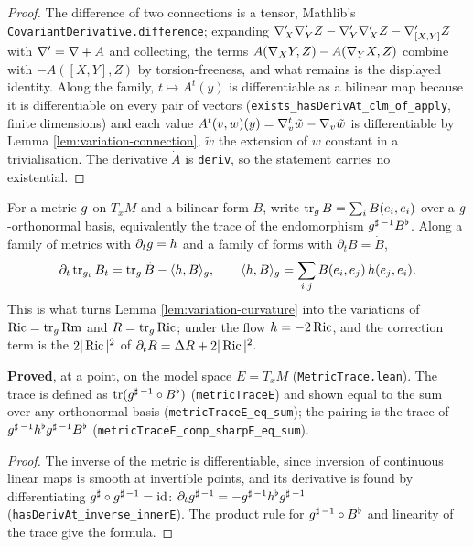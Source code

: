 \begin{proof}
  \leanok
  The difference of two connections is a tensor, Mathlib's
  \texttt{CovariantDerivative.difference}; expanding
  $\nabla'_X \nabla'_Y Z - \nabla'_Y \nabla'_X Z - \nabla'_{[X,Y]} Z$ with
  $\nabla' = \nabla + A$ and collecting, the terms $A(\nabla_X Y, Z) - A(\nabla_Y X, Z)$
  combine with $-A([X,Y], Z)$ by torsion-freeness, and what remains is the
  displayed identity. Along the family, $t \mapsto A^t(y)$ is differentiable as a
  bilinear map because it is differentiable on every pair of vectors
  (\texttt{exists\_hasDerivAt\_clm\_of\_apply}, finite dimensions) and each value
  $A^t(v,w)(y) = \nabla^t_v \tilde w - \nabla_v \tilde w$ is differentiable by
  Lemma \ref{lem:variation-connection}, $\tilde w$ the extension of $w$ constant
  in a trivialisation. The derivative $\dot A$ is \texttt{deriv}, so the
  statement carries no existential.
\end{proof}

\begin{lemma}
  \label{lem:metric-trace-variation}
  \leanok
  For a metric $g$ on $T_xM$ and a bilinear form $B$, write
  $\operatorname{tr}_g B = \sum_i B(e_i,e_i)$ over a $g$-orthonormal basis,
  equivalently the trace of the endomorphism $g^{\sharp\,-1} B^\flat$. Along a
  family of metrics with $\partial_t g = h$ and a family of forms with
  $\partial_t B = \dot B$,
  \[
    \partial_t \operatorname{tr}_{g_t} B_t
      = \operatorname{tr}_g \dot B - \langle h, B\rangle_g,
    \qquad
    \langle h, B\rangle_g = \sum_{i,j} B(e_i,e_j)\, h(e_j,e_i).
  \]
  This is what turns Lemma \ref{lem:variation-curvature} into the variations of
  $\operatorname{Ric} = \operatorname{tr}_g \operatorname{Rm}$ and $R = \operatorname{tr}_g \operatorname{Ric}$; under
  the flow $h = -2\operatorname{Ric}$, and the correction term is the $2|\operatorname{Ric}|^2$ of
  $\partial_t R = \Delta R + 2|\operatorname{Ric}|^2$.

  \textbf{Proved}, at a point, on the model space $E = T_xM$
  (\texttt{MetricTrace.lean}). The trace is defined as
  $\operatorname{tr}(g^{\sharp\,-1} \circ B^\flat)$
  (\texttt{metricTraceE}) and shown equal to the sum over any orthonormal basis
  (\texttt{metricTraceE\_eq\_sum}); the pairing is the trace of
  $g^{\sharp\,-1} h^\flat g^{\sharp\,-1} B^\flat$
  (\texttt{metricTraceE\_comp\_sharpE\_eq\_sum}).
\end{lemma}

\begin{proof}
  \leanok
  The inverse of the metric is differentiable, since inversion of continuous
  linear maps is smooth at invertible points, and its derivative is found by
  differentiating $g^\sharp \circ g^{\sharp\,-1} = \mathrm{id}$:
  $\partial_t g^{\sharp\,-1} = -g^{\sharp\,-1} h^\flat g^{\sharp\,-1}$
  (\texttt{hasDerivAt\_inverse\_innerE}). The product rule for
  $g^{\sharp\,-1} \circ B^\flat$ and linearity of the trace give the formula.
\end{proof}

